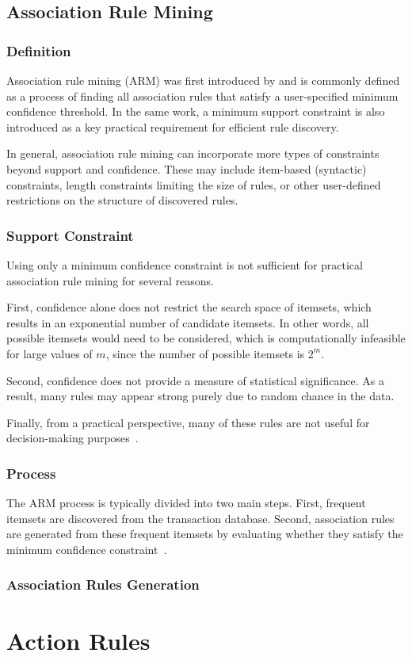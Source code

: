 \subsection{Association Rule Mining}

\subsubsection{Definition}

Association rule mining (ARM) was first introduced by \textcite{Agrawal1993} and is commonly defined as a process of finding all association rules that satisfy a user-specified minimum confidence threshold. In the same work, a minimum support constraint is also introduced as a key practical requirement for efficient rule discovery.

In general, association rule mining can incorporate more types of constraints beyond support and confidence. These may include item-based (syntactic) constraints, length constraints limiting the size of rules, or other user-defined restrictions on the structure of discovered rules.

\subsubsection{Support Constraint}

Using only a minimum confidence constraint is not sufficient for practical association rule mining for several reasons.

First, confidence alone does not restrict the search space of itemsets, which results in an exponential number of candidate itemsets. In other words, all possible itemsets would need to be considered, which is computationally infeasible for large values of $m$, since the number of possible itemsets is $2^m$.

Second, confidence does not provide a measure of statistical significance. As a result, many rules may appear strong purely due to random chance in the data.

Finally, from a practical perspective, many of these rules are not useful for decision-making purposes~\parencite{Agrawal1993}.

\subsubsection{Process}

The ARM process is typically divided into two main steps. First, frequent itemsets are discovered from the transaction database. Second, association rules are generated from these frequent itemsets by evaluating whether they satisfy the minimum confidence constraint~\parencite{Agrawal1993}.

\subsubsection{Association Rules Generation}



\section{Action Rules}
